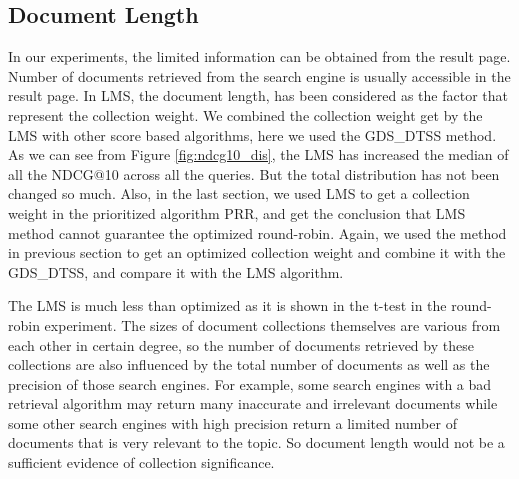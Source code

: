 \subsection{Document Length}

In our experiments, the limited information can be obtained from the result page. Number of documents retrieved from the search engine is usually accessible in the result page. In LMS, the document length, has been considered as the factor that represent the collection weight. We combined the collection weight get by the LMS with other score based algorithms, here we used the GDS\_DTSS method. As we can see from Figure \ref{fig:ndcg10_dis}, the LMS has increased the median of all the NDCG@10 across all the queries. But the total distribution has not been changed so much. Also, in the last section, we used LMS to get a collection weight in the prioritized algorithm PRR, and get the conclusion that LMS method cannot guarantee the optimized round-robin. Again, we used the method in previous section to get an optimized collection weight and combine it with the GDS\_DTSS, and compare it with the LMS algorithm. 


The LMS is much less than optimized as it is shown in the t-test in the round-robin experiment. The sizes of document collections themselves are various from each other in certain degree, so the number of documents retrieved by these collections are also influenced by the total number of documents as well as the precision of those search engines. For example, some search engines with a bad retrieval algorithm may return many inaccurate and irrelevant documents while some other search engines with high precision return a limited number of documents that is very relevant to the topic. So document length would not be a sufficient evidence of collection significance.

